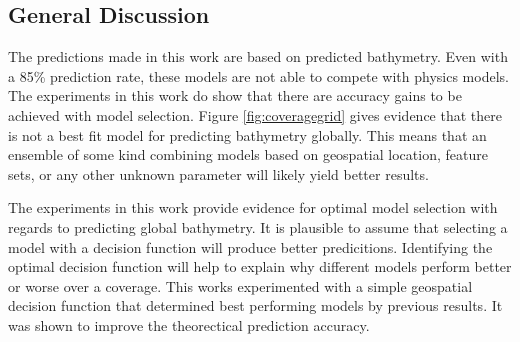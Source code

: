 
\subsection{General Discussion}
The predictions made in this work are based on predicted bathymetry.
Even with a 85\% prediction rate, these models are not able to compete with physics models.
The experiments in this work do show that there are accuracy gains to be achieved with model selection.
Figure \ref{fig:coveragegrid} gives evidence that there is not a best fit model for predicting bathymetry globally.
This means that an ensemble of some kind combining models based on geospatial location, feature sets, or any other unknown parameter will likely yield better results.

The experiments in this work provide evidence for optimal model selection with regards to predicting global bathymetry.
It is plausible to assume that selecting a model with a decision function will produce better predicitions.
Identifying the optimal decision function will help to explain why different models perform better or worse over a coverage.
This works experimented with a simple geospatial decision function that determined best performing models by previous results.
It was shown to improve the theorectical prediction accuracy.
